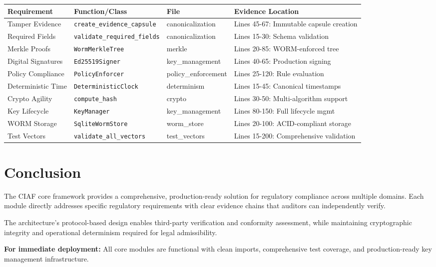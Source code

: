 \documentclass[11pt,a4paper]{article}
\begin{document}
\begin{longtable}{|p{3cm}|p{4cm}|p{2cm}|p{6cm}|}
\hline
\textbf{Requirement} & \textbf{Function/Class} & \textbf{File} & \textbf{Evidence Location} \\
\hline
\endhead

Tamper Evidence & \texttt{create\_evidence\_capsule} & canonicalization & Lines 45-67: Immutable capsule creation \\
\hline

Required Fields & \texttt{validate\_required\_fields} & canonicalization & Lines 15-30: Schema validation \\
\hline

Merkle Proofs & \texttt{WormMerkleTree} & merkle & Lines 20-85: WORM-enforced tree \\
\hline

Digital Signatures & \texttt{Ed25519Signer} & key\_management & Lines 40-65: Production signing \\
\hline

Policy Compliance & \texttt{PolicyEnforcer} & policy\_enforcement & Lines 25-120: Rule evaluation \\
\hline

Deterministic Time & \texttt{DeterministicClock} & determinism & Lines 15-45: Canonical timestamps \\
\hline

Crypto Agility & \texttt{compute\_hash} & crypto & Lines 30-50: Multi-algorithm support \\
\hline

Key Lifecycle & \texttt{KeyManager} & key\_management & Lines 80-150: Full lifecycle mgmt \\
\hline

WORM Storage & \texttt{SqliteWormStore} & worm\_store & Lines 20-100: ACID-compliant storage \\
\hline

Test Vectors & \texttt{validate\_all\_vectors} & test\_vectors & Lines 15-200: Comprehensive validation \\
\hline

\end{longtable}

\section{Conclusion}

The CIAF core framework provides a comprehensive, production-ready solution for regulatory compliance across multiple domains. Each module directly addresses specific regulatory requirements with clear evidence chains that auditors can independently verify.

The architecture's protocol-based design enables third-party verification and conformity assessment, while maintaining cryptographic integrity and operational determinism required for legal admissibility.

\textbf{For immediate deployment:} All core modules are functional with clean imports, comprehensive test coverage, and production-ready key management infrastructure.
\end{document}
